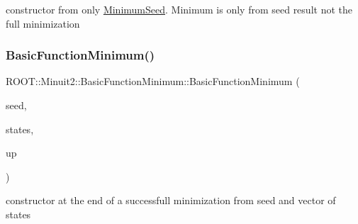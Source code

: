 constructor from only \mbox{\hyperlink{classROOT_1_1Minuit2_1_1MinimumSeed}{Minimum\+Seed}}. Minimum is only from seed result not the full minimization 

\mbox{\label{classROOT_1_1Minuit2_1_1BasicFunctionMinimum_a8a2f91243b896e3fe682c19ccd57a9bc}} 
\subsubsection{\texorpdfstring{BasicFunctionMinimum()}{BasicFunctionMinimum()}\hspace{0.1cm}{\footnotesize\ttfamily [2/10]}}
{\footnotesize\ttfamily R\+O\+O\+T\+::\+Minuit2\+::\+Basic\+Function\+Minimum\+::\+Basic\+Function\+Minimum (\begin{DoxyParamCaption}\item[{const \mbox{\hyperlink{classROOT_1_1Minuit2_1_1MinimumSeed}{Minimum\+Seed}} \&}]{seed,  }\item[{const std\+::vector$<$ \mbox{\hyperlink{classROOT_1_1Minuit2_1_1MinimumState}{Minimum\+State}} $>$ \&}]{states,  }\item[{double}]{up }\end{DoxyParamCaption})\hspace{0.3cm}{\ttfamily [inline]}}



constructor at the end of a successfull minimization from seed and vector of states 

\mbox{\label{classROOT_1_1Minuit2_1_1BasicFunctionMinimum_a2a15d2336acfb9f3be41de8e477c191a}} 
